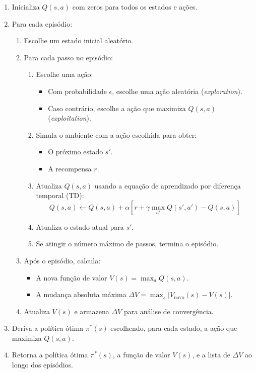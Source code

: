 \begin{enumerate}
    \item Inicializa \( Q(s, a) \) com zeros para todos os estados e ações.
    \item Para cada episódio:
    \begin{enumerate}
        \item Escolhe um estado inicial aleatório.
        \item Para cada passo no episódio:
        \begin{enumerate}
            \item Escolhe uma ação:
            \begin{itemize}
                \item Com probabilidade \( \epsilon \), escolhe uma ação aleatória (\textit{exploration}).
                \item Caso contrário, escolhe a ação que maximiza \( Q(s, a) \) (\textit{exploitation}).
            \end{itemize}
            \item Simula o ambiente com a ação escolhida para obter:
            \begin{itemize}
                \item O próximo estado \( s' \).
                \item A recompensa \( r \).
            \end{itemize}
            \item Atualiza \( Q(s, a) \) usando a equação de aprendizado por diferença temporal (TD):
            \[
            Q(s, a) \leftarrow Q(s, a) + \alpha \left[ r + \gamma \max_{a'} Q(s', a') - Q(s, a) \right]
            \]
            \item Atualiza o estado atual para \( s' \).
            \item Se atingir o número máximo de passos, termina o episódio.
        \end{enumerate}
        \item Após o episódio, calcula:
        \begin{itemize}
            \item A nova função de valor \( V(s) = \max_a Q(s, a) \).
            \item A mudança absoluta máxima \( \Delta V = \max_s |V_{\text{novo}}(s) - V(s)| \).
        \end{itemize}
        \item Atualiza \( V(s) \) e armazena \( \Delta V \) para análise de convergência.
    \end{enumerate}
    \item Deriva a política ótima \( \pi^*(s) \) escolhendo, para cada estado, a ação que maximiza \( Q(s, a) \).
    \item Retorna a política ótima \( \pi^*(s) \), a função de valor \( V(s) \), e a lista de \( \Delta V \) ao longo dos episódios.
\end{enumerate}

